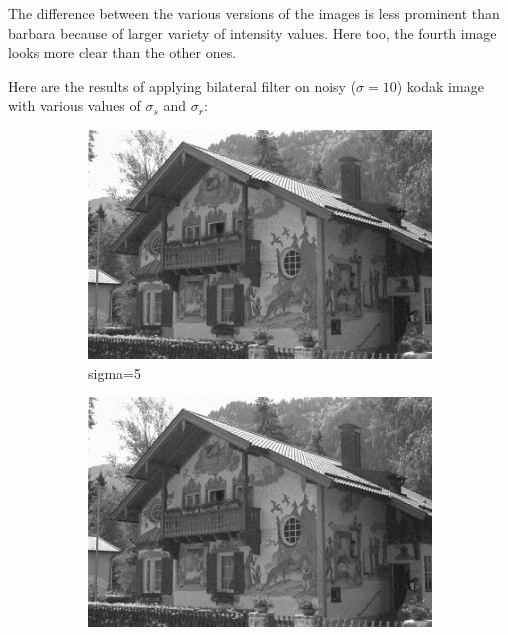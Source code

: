 \documentclass[12pt]{article}
\begin{document}
The difference between the various versions of the images is less prominent than barbara because of larger variety of intensity values. Here too, the fourth image looks more clear than the other ones.


Here are the results of applying bilateral filter on noisy ($\sigma = 10$) kodak image with various values of $\sigma_s$ and $\sigma_r$:

\begin{figure}[h]
    \centering
    \begin{subfigure}[b]{0.24\textwidth}
        \centering
        \includegraphics[width=\textwidth]{../images/noisy_kodak_10.png}
        \caption{sigma=5}
        \label{Noisy (sigma=10)}
    \end{subfigure}
    \begin{subfigure}[b]{0.24\textwidth}
        \centering
        \includegraphics[width=\textwidth]{../images/filtered_kodak_10_sigma_s_2_sigma_r_2.png}

\end{subfigure}
\end{figure}
\end{document}
